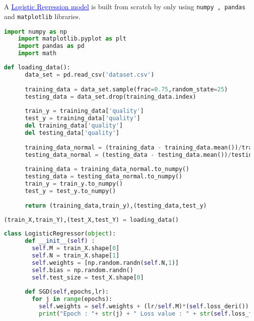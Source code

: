 \documentclass[12pt,a4paper]{article}
\begin{document}
{\section{}
A \href{https://github.com/IITH-Epoch/Handouts-2022-2023/blob/main/Logistic%20Regression/Logistic%20Regression.ipynb}{\textcolor{blue}{\underline{Logistic Regression model}}} is built from scratch by only using \texttt{numpy , pandas} and \texttt{matplotlib} libraries.\\

\begin{lstlisting}[language=python, style = mystyle]
	  import numpy as np
    import matplotlib.pyplot as plt
    import pandas as pd
    import math
\end{lstlisting}
\begin{lstlisting}[language=python, style = mystyle]
  def loading_data():
      data_set = pd.read_csv('dataset.csv')
  
      training_data = data_set.sample(frac=0.75,random_state=25)
      testing_data = data_set.drop(training_data.index)
  
      train_y = training_data['quality']
      test_y = training_data['quality']
      del training_data['quality']
      del testing_data['quality']
  
      training_data_normal = (training_data - training_data.mean())/training_data.std()
      testing_data_normal = (testing_data - testing_data.mean())/testing_data.std()
      
      training_data = training_data_normal.to_numpy()
      testing_data = testing_data_normal.to_numpy()
      train_y = train_y.to_numpy()
      test_y = test_y.to_numpy()
      
      return (training_data,train_y),(testing_data,test_y)
\end{lstlisting}
\begin{lstlisting}[language=python, style = mystyle]
	  (train_X,train_Y),(test_X,test_Y) = loading_data()

\end{lstlisting}
\begin{lstlisting}[language=python, style = mystyle]
    class LogisticRegressor(object):
      def __init__(self) :
        self.M = train_X.shape[0]
        self.N = train_X.shape[1]
        self.weights = [np.random.randn(self.N,1)]
        self.bias = np.random.randn()
        self.test_size = test_X.shape[0]
      
      def SGD(self,epochs,lr):
        for j in range(epochs):
          self.weights = self.weights + (lr/self.M)*(self.loss_deri())
          print("Epoch : "+ str(j) + " Loss value : " + str(self.loss_function()) + " Accuracy : " + str(self.accuracy()))
          

\end{lstlisting}}
\end{document}
